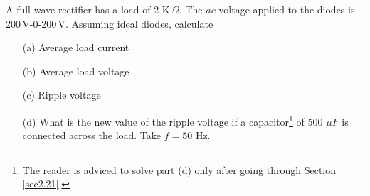\begin{example}\label{exam2.8}
A full-wave rectifier has a load of 2 K$\,\Omega$. The $ac$  voltage
applied to the diodes is 200\,V-0-200\,V. Assuming ideal diodes,
calculate
\begin{itemize}
\item[(a)] Average load current

\item[(b)] Average load voltage

\item[(c)] Ripple voltage

\item[(d)] What is the new value of the ripple voltage if a
  capacitor\footnote{The reader is adviced to solve part (d) only
    after going through Section \ref{sec2.21}.} of 500 $\mu F$ is connected  across
  the load. Take $f = 50$ Hz.
\end{itemize}
\end{example}

